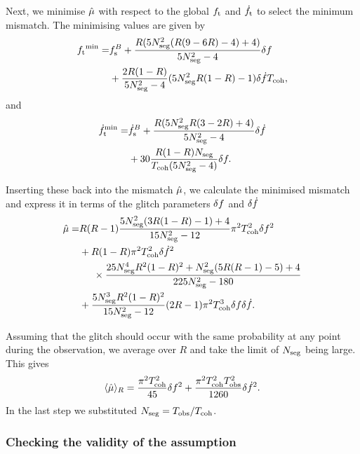 \documentclass[../full_thesis/full_thesis.tex]{subfiles}
\begin{document}
Next, we minimise $\hat{\mu}$ with respect to the global ${f_{\textrm{t}}}$ and $\dot{f}_{\textrm{t}}$ to
select the minimum mismatch. The minimising values are given by
\begin{align}
\begin{split}
{f_{\textrm{t}}}^{\textrm{min}}  = & f_{\textrm{s}}^{B}
+ \frac{R(5N_{\textrm{seg}}^{2}(R(9-6R)-4) + 4)}{5N_{\textrm{seg}}^{2}-4}\delta f \\
& + \frac{2R(1-R)}{5N_{\textrm{seg}}^{2}-4}(5N_{\textrm{seg}}^{2}R(1-R)-1)\delta\dot{f}T_{\mathrm{coh}},
\end{split}
\end{align}
and
\begin{align}
\begin{split}
\dot{f}_{\textrm{t}}^{\textrm{min}} = & \dot{f}_{\textrm{s}}^{B}
+ \frac{R(5N_{\textrm{seg}}^{2}R(3-2R)+ 4)}{5N_{\textrm{seg}}^{2}-4}\delta\dot{f} \\
& + 30\frac{R(1-R)N_{\textrm{seg}}}{T_{\mathrm{coh}}(5N_{\textrm{seg}}^{2} - 4)}\delta f.
\end{split}
\end{align}

Inserting these back into the mismatch $\hat{\mu}$, we calculate the minimised
mismatch and express it in terms of the glitch parameters $\delta f$ and
$\delta\dot{f}$
\begin{align}
\begin{split}
\hat{\mu} = & R(R-1)\frac{5N_{\textrm{seg}}^{2}(3R(1-R)-1) + 4}{15N_{\textrm{seg}}^{2}-12}\pi^{2}
            T_{\mathrm{coh}}^{2}\delta f^{2} \\
& + R(1-R)\pi^{2}T_{\mathrm{coh}}^{2}\delta\dot{f}^{2} \\
& \hspace{5mm}\times\frac{25N_{\textrm{seg}}^{4}R^{2}(1-R)^{2} + N_{\textrm{seg}}^{2}(5R(R-1)-5) + 4}{225N_{\textrm{seg}}^{2}-180} \\
& + \frac{5N_{\textrm{seg}}^{3}R^{2}(1-R)^{2}}{15N_{\textrm{seg}}^{2}-12}(2R-1)
   \pi^{2}T_{\mathrm{coh}}^{3}\delta f\delta\dot{f}.
\end{split}
\label{eqn: mu semi-coherent R}
\end{align}

Assuming that the glitch should occur with the same probability at any point
during the observation, we average over $R$ and take the limit of $N_{\textrm{seg}}$ being
large. This gives
\begin{align}
\langle\hat{\mu}\rangle_{R} = \frac{\pi^{2}T_{\mathrm{coh}}^{2}}{45}\delta f^{2}
      + \frac{\pi^{2}T_{\mathrm{coh}}^{2}T_{\mathrm{obs}}^{2}}{1260}\delta\dot{f}^{2}.
\label{eqn: R-averaged semi-coherent}
\end{align}
In the last step we substituted $N_{\textrm{seg}}=T_{\mathrm{obs}}/T_{\mathrm{coh}}$.

\subsubsection{Checking the validity of the assumption}
\end{document}
